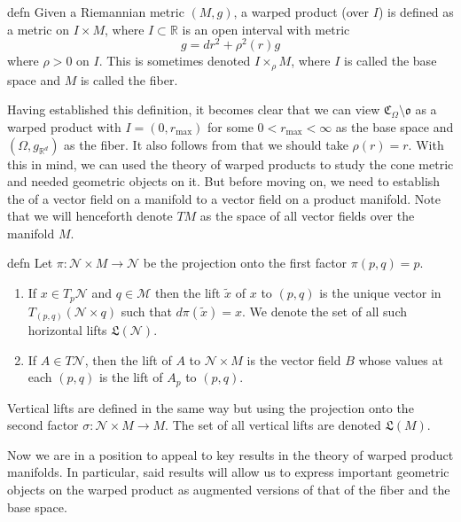 \documentclass[11pt]{article}
\newcommand{\man}{M}
\begin{document}
\begin{restatable}{defn}{}
    Given a Riemannian metric $(\man, g)$, a warped product (over $I$) is defined as a metric on $I \times \man$, where $I \subset \mathbb{R}$ is an open interval with metric 
    \[g = dr^2 + \rho^2(r)g\]
    where $\rho > 0$ on $I$. This is sometimes denoted $I \times_{\rho} \man$, where $I$ is called the base space and $\man$ is called the fiber.
\end{restatable}
Having established this definition, it becomes clear that we can view $\mathfrak{C}_\Omega \setminus \mathfrak{o}$ as a warped product with $I = (0, r_{\max})$ for some $0 < r_{\max} <\infty $ as the base space and $(\Omega, g_{\mathbb{R}^d})$ as the fiber. It also follows from  that we should take $\rho(r) = r$. With this in mind, we can used the theory of warped products to study the cone metric and needed geometric objects on it. But before moving on, we need to establish the  of a vector field on a manifold to a vector field on a product manifold. Note that we will henceforth denote $T\man$ as the space of all vector fields over the manifold $\man$. 

\begin{restatable}{defn}{}
    Let $\pi: \mathcal{N} \times \man\rightarrow \mathcal{N}$ be the projection onto the first factor $\pi(p, q) = p$. 
    \begin{enumerate}
        \item If $x \in T_p\mathcal{N}$ and $q \in \mathcal{M}$ then the lift $\tilde{x}$ of $x$ to $(p,q)$ is the unique vector in $T_{(p,q)}(\mathcal{N} \times q)$ such that $d\pi(\tilde{x}) = x$. We denote the set of all such horizontal lifts $\mathfrak{L}(\mathcal{N}).$
        \item If $A \in T\mathcal{N}$, then the lift of $A$ to $\mathcal{N} \times \man$ is the vector field $B$ whose values at each $(p,q)$ is the lift of $A_p$ to $(p,q).$
    \end{enumerate}
    Vertical lifts are defined in the same way but using the projection onto the second factor $\sigma: \mathcal{N} \times \man \rightarrow \man$. The set of all vertical lifts are denoted $\mathfrak{L}(\man).$ 
\end{restatable}

Now we are in a position to appeal to key results in the theory of warped product manifolds. In particular, said results will allow us to express important geometric objects on the warped product as augmented versions of that of the fiber and the base space. 
\end{document}
